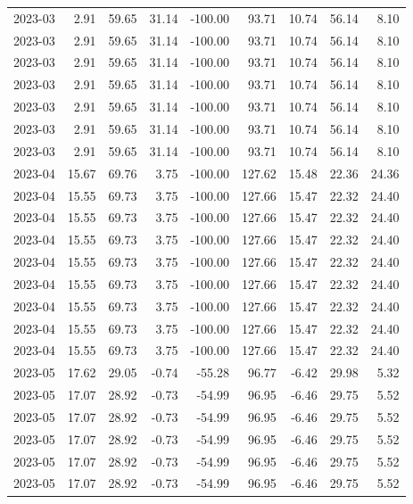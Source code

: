 \begin{table}[ht]
\begin{tabular}{lrrrrrrrr}
  2023-03 & 2.91 & 59.65 & 31.14 & -100.00 & 93.71 & 10.74 & 56.14 & 8.10 \\ 
  2023-03 & 2.91 & 59.65 & 31.14 & -100.00 & 93.71 & 10.74 & 56.14 & 8.10 \\ 
  2023-03 & 2.91 & 59.65 & 31.14 & -100.00 & 93.71 & 10.74 & 56.14 & 8.10 \\ 
  2023-03 & 2.91 & 59.65 & 31.14 & -100.00 & 93.71 & 10.74 & 56.14 & 8.10 \\ 
  2023-03 & 2.91 & 59.65 & 31.14 & -100.00 & 93.71 & 10.74 & 56.14 & 8.10 \\ 
  2023-03 & 2.91 & 59.65 & 31.14 & -100.00 & 93.71 & 10.74 & 56.14 & 8.10 \\ 
  2023-03 & 2.91 & 59.65 & 31.14 & -100.00 & 93.71 & 10.74 & 56.14 & 8.10 \\ 
  2023-04 & 15.67 & 69.76 & 3.75 & -100.00 & 127.62 & 15.48 & 22.36 & 24.36 \\ 
  2023-04 & 15.55 & 69.73 & 3.75 & -100.00 & 127.66 & 15.47 & 22.32 & 24.40 \\ 
  2023-04 & 15.55 & 69.73 & 3.75 & -100.00 & 127.66 & 15.47 & 22.32 & 24.40 \\ 
  2023-04 & 15.55 & 69.73 & 3.75 & -100.00 & 127.66 & 15.47 & 22.32 & 24.40 \\ 
  2023-04 & 15.55 & 69.73 & 3.75 & -100.00 & 127.66 & 15.47 & 22.32 & 24.40 \\ 
  2023-04 & 15.55 & 69.73 & 3.75 & -100.00 & 127.66 & 15.47 & 22.32 & 24.40 \\ 
  2023-04 & 15.55 & 69.73 & 3.75 & -100.00 & 127.66 & 15.47 & 22.32 & 24.40 \\ 
  2023-04 & 15.55 & 69.73 & 3.75 & -100.00 & 127.66 & 15.47 & 22.32 & 24.40 \\ 
  2023-04 & 15.55 & 69.73 & 3.75 & -100.00 & 127.66 & 15.47 & 22.32 & 24.40 \\ 
  2023-05 & 17.62 & 29.05 & -0.74 & -55.28 & 96.77 & -6.42 & 29.98 & 5.32 \\ 
  2023-05 & 17.07 & 28.92 & -0.73 & -54.99 & 96.95 & -6.46 & 29.75 & 5.52 \\ 
  2023-05 & 17.07 & 28.92 & -0.73 & -54.99 & 96.95 & -6.46 & 29.75 & 5.52 \\ 
  2023-05 & 17.07 & 28.92 & -0.73 & -54.99 & 96.95 & -6.46 & 29.75 & 5.52 \\ 
  2023-05 & 17.07 & 28.92 & -0.73 & -54.99 & 96.95 & -6.46 & 29.75 & 5.52 \\ 
  2023-05 & 17.07 & 28.92 & -0.73 & -54.99 & 96.95 & -6.46 & 29.75 & 5.52 \\ 

\end{tabular}
\end{table}
